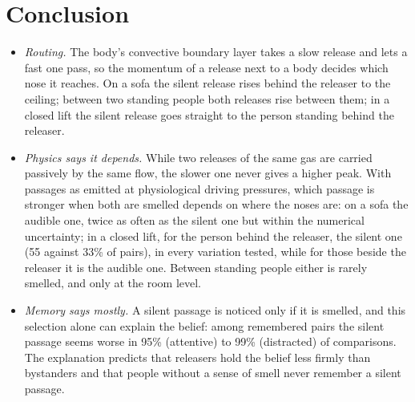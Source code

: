 \section{Conclusion}
\label{sec:conclusion}

\begin{itemize}
  \item \emph{Routing.} The body's convective boundary layer takes a slow release and lets a fast one pass, so the
  momentum of a release next to a body decides which nose it reaches. On a sofa the silent release rises behind the
  releaser to the ceiling; between two standing people both releases rise between them; in a closed lift the silent
  release goes straight to the person standing behind the releaser.
  \item \emph{Physics says it depends.} While two releases of the same gas are carried passively by the same flow, the
  slower one never gives a higher peak. With passages as emitted at physiological driving pressures, which passage is
  stronger when both are smelled depends on where the noses are: on a sofa the audible one, twice as often as the
  silent one but within the numerical uncertainty; in a closed lift, for the person behind the releaser, the silent
  one (55 against 33\% of pairs), in every variation tested, while for those beside the releaser it is the audible
  one. Between standing people either is rarely smelled, and only at the
  room level.
  \item \emph{Memory says mostly.} A silent passage is noticed only if it is smelled, and this selection alone can
  explain the belief: among remembered pairs the silent passage seems worse in 95\% (attentive) to 99\%
  (distracted) of comparisons. The explanation predicts that releasers hold the belief less firmly than bystanders
  and that people without a sense of smell never remember a silent passage.
\end{itemize}

